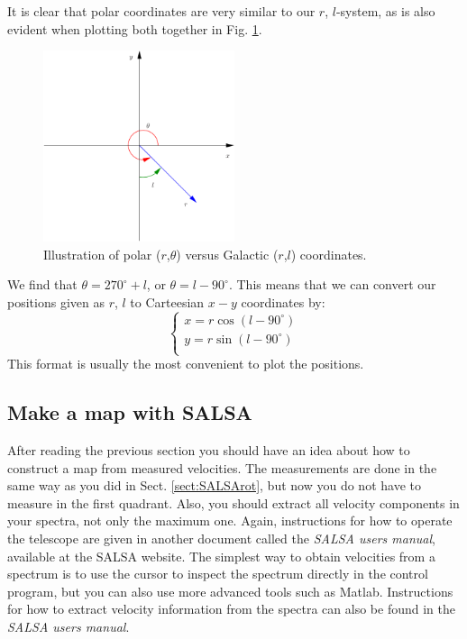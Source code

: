 It is clear that polar coordinates are very similar to our $r$, $l$-system,
as is also evident when plotting both together in Fig. \ref{fig:polar}.
\begin{figure}[ht]
\begin{center}
\includegraphics[width=0.5\textwidth]{../figures/coordinate.pdf}
\caption{Illustration of polar ($r$,$\theta$) versus Galactic
  ($r$,$l$) coordinates.}
\label{fig:polar}
\end{center}
\end{figure}
We find that $\theta=270^\circ +l$, or $\theta=l-90^\circ$. This means that we can convert our positions given as $r$,
$l$ to Carteesian $x-y$ coordinates by:
\begin{equation}
	\boxed{
\left\{ 
\begin{array}{l}
	x=r \cos (l-90^\circ) \\
	y=r \sin (l-90^\circ) \\
\end{array}
\right.}
\label{eqn:rpmtocart}
\end{equation} 
This format is usually the most convenient to plot the positions. 

\subsection{Make a map with SALSA}
\label{sect:SALSAmap}
After reading the previous section you should have an idea about how to
construct a map from measured velocities. The measurements are done in the same
way as you did in Sect. \ref{sect:SALSArot}, but now you do not have to measure
in the first quadrant. Also, you should extract all velocity components in your
spectra, not only the maximum one.  Again, instructions for how to operate the
telescope are given in another document called the \emph{SALSA users manual},
available at the SALSA website.  The simplest way to obtain velocities from a
spectrum is to use the cursor to inspect the spectrum directly in the control
program, but you can also use more advanced tools such as Matlab. Instructions
for how to extract velocity information from the spectra can also be found in
the \emph{SALSA users manual}.


